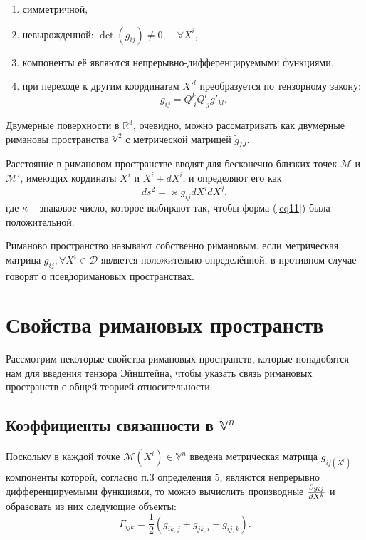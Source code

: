 \documentclass[14pt,a4paper]{extarticle}
\begin{document}
\begin{enumerate}
	\item симметричной,
	\item невырожденной: $\det (\tilde{g}_{ij}) \neq 0, \quad \forall X^i$,
	\item компоненты её являются непрерывно-дифференцируемыми функциями,
	\item при переходе к другим координатам $X'^l$ преобразуется по тензорному закону:
	\begin{equation}\label{eq10}
		g_{ij} = Q_{\; i}^k Q_{\; j}^l g'_{kl}.
	\end{equation}
\end{enumerate}


Двумерные поверхности в $\mathbb{R}^3$, очевидно, можно рассматривать как двумерные римановы пространства $\mathbb{V}^2$ с метрической матрицей $\tilde{g}_{IJ}$.

Расстояние в римановом пространстве вводят для бесконечно близких точек $\mathcal{M}$ и $\mathcal{M'}$, имеющих кординаты $X^i$ и $X^i + dX^i$, и определяют его как
\begin{equation}\label{eq11}
	ds^2 = \varkappa g_{ij} dX^idX^j,
\end{equation}
где $\kappa$ -- знаковое число, которое выбирают так, чтобы форма (\ref{eq11}) была положительной.


Риманово пространство называют собственно римановым, если метрическая матрица $g_{ij}, \forall X^i \in \mathcal{D}$ является положительно-определённой, в противном случае говорят о псевдоримановых пространствах.


\section{Свойства римановых пространств}
Рассмотрим некоторые свойства римановых пространств, которые понадобятся нам для введения тензора Эйнштейна, чтобы указать связь римановых пространств с общей теорией относительности.

\subsection{Коэффициенты связанности в $\mathbb{V}^n$}
Поскольку в каждой точке $\mathcal{M}(X^i) \in \mathbb{V}^n$ введена метрическая матрица $g_{ij(X^i)}$ компоненты которой, согласно п.3 определения 5, являются непрерывно дифференцируемыми функциями, то можно вычислить производные $\pdv{g_{ij}}{X^k}$ и образовать из них следующие объекты:
\begin{equation}\label{eq12}
	\Gamma_{ijk} = \frac{1}{2}(g_{ik,j} + g_{jk,i} - g_{ij,k}).
\end{equation}
\end{document}
